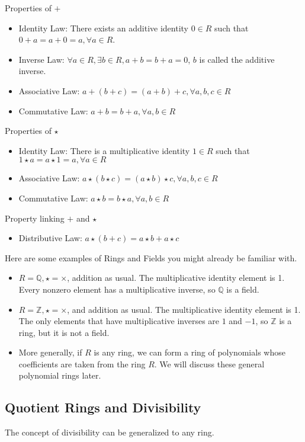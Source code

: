 \documentclass{article}
\begin{document}
Properties of $+$
\begin{itemize}
    \item Identity Law: There exists an additive identity $0 \in R$ such that $0 + a = a + 0 = a, \forall a \in R$.
    \item Inverse Law: $\forall a \in R, \exists b \in R, a + b = b + a = 0$, $b$ is called the additive inverse.
    \item Associative Law: $a + (b + c) = (a + b) + c, \forall a,b,c \in R$
    \item Commutative Law: $a + b = b + a, \forall a,b \in R$
\end{itemize}

Properties of $\star$
\begin{itemize}
    \item Identity Law: There is a multiplicative identity $1 \in R$ such that $1 \star a = a \star 1 = a, \forall a \in R$
    \item Associative Law: $a \star (b \star c) = (a \star b) \star c, \forall a,b,c \in R$
    \item Commutative Law: $a \star b = b \star a, \forall a,b \in R$
\end{itemize}

Property linking $+$ and $\star$
\begin{itemize}
    \item Distributive Law: $a \star (b + c) = a \star b + a \star c$
\end{itemize}

\noindent Here are some examples of Rings and Fields you might already be familiar with.

\begin{itemize}
    \item $R = \mathbb{Q}, \star = \times$, addition as usual. The multiplicative identity element is 1. Every nonzero element has a multiplicative inverse, so $\mathbb{Q}$ is a field.
    \item $R = \mathbb{Z}, \star = \times$, and addition as usual. The multiplicative identity element is 1. The only elements that have multiplicative inverses are $1$ and $-1$, so $\mathbb{Z}$ is a ring, but it is not a field.
    \item More generally, if $R$ is any ring, we can form a ring of polynomials whose coefficients are taken from the ring $R$. We will discuss these general polynomial rings later.
\end{itemize}

\subsection{Quotient Rings and Divisibility}
The concept of divisibility can be generalized to any ring. \\
\end{document}
